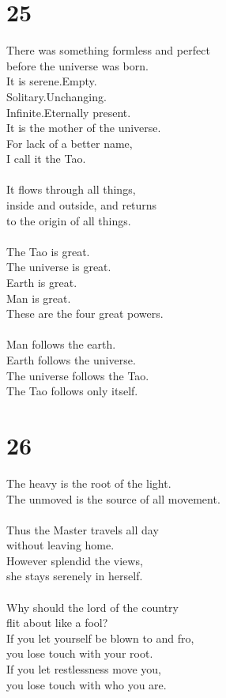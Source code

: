 \documentclass[b5paper, 12pt, oneside]{book}
\begin{document}
\chapter*{25}
There was something formless and perfect\\
before the universe was born.\\
It is serene.Empty.\\
Solitary.Unchanging.\\
Infinite.Eternally present.\\
It is the mother of the universe.\\
For lack of a better name,\\
I call it the Tao.\\
\\
It flows through all things,\\
inside and outside, and returns\\
to the origin of all things.\\
\\
The Tao is great.\\
The universe is great.\\
Earth is great.\\
Man is great.\\
These are the four great powers.\\
\\
Man follows the earth.\\
Earth follows the universe.\\
The universe follows the Tao.\\
The Tao follows only itself.

\chapter*{26}
The heavy is the root of the light.\\
The unmoved is the source of all movement.\\
\\
Thus the Master travels all day\\
without leaving home.\\
However splendid the views,\\
she stays serenely in herself.\\
\\
Why should the lord of the country\\
flit about like a fool?\\
If you let yourself be blown to and fro,\\
you lose touch with your root.\\
If you let restlessness move you,\\
you lose touch with who you are.\\
\end{document}
